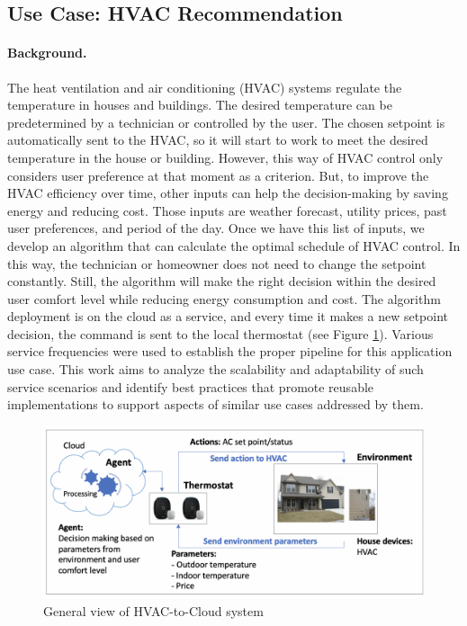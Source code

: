 \subsection{Use Case: HVAC Recommendation}

\paragraph*{Background.}
The heat ventilation and air conditioning (HVAC) systems regulate the temperature in houses and buildings. 
The desired temperature can be predetermined by a technician or controlled by the user. The chosen setpoint 
is automatically sent to the HVAC, so it will start to work to meet the desired temperature in the house or 
building. However, this way of HVAC control only considers user preference at that moment as a criterion. But, to improve the HVAC efficiency over time, other inputs can help the decision-making by saving energy and reducing cost. Those inputs are weather forecast, utility prices, past user preferences, and period of the day. Once we have this list of inputs, we develop an algorithm that can calculate the optimal schedule of HVAC control. In this way, the technician or homeowner does not need to change the setpoint constantly. Still, the algorithm will make the right decision within the desired user comfort level while reducing energy consumption and cost. The algorithm deployment is on the cloud as a service, and every time it makes a new 
setpoint decision, the command is sent to the local thermostat (see Figure \ref{fig:hvac_general}). Various service 
frequencies were used to establish the proper pipeline for this application use case. This work aims to analyze the scalability and adaptability of such service scenarios and identify best practices that promote reusable implementations to support aspects of similar use cases addressed by them.

\begin{figure}[htb]
\centering\includegraphics[width=1.0\columnwidth]{usecase/hvac_general.png}
\caption{General view of HVAC-to-Cloud system \cite{kotevska2020rl}}
\label{fig:hvac_general}
\end{figure}

